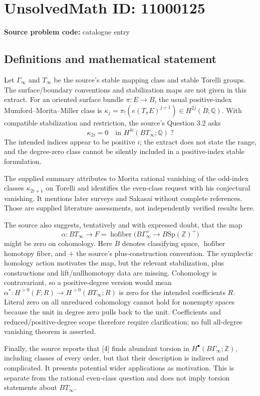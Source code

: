 \documentclass[11pt]{article}
\newcommand{\Z}{\mathbb{Z}}
\newcommand{\Q}{\mathbb{Q}}
\begin{document}
\section*{UnsolvedMath ID: 11000125}
\textbf{Source problem code:} catalogue entry
\subsection{Definitions and mathematical statement}
Let \(\Gamma_\infty\) and \(T_\infty\) be the source's stable mapping class and stable Torelli groups. The surface/boundary conventions and stabilization maps are not given in this extract. For an oriented surface bundle \(\pi:E\to B\), the usual positive-index Mumford--Morita--Miller class is \(\kappa_j=\pi_!(e(T_\pi E)^{j+1})\in H^{2j}(B;\Q)\). With compatible stabilization and restriction, the source's Question 3.2 asks
\[
 \kappa_{2i}=0\quad\text{in }H^{4i}(BT_\infty;\Q)\ ?
\]
The intended indices appear to be positive \(i\); the extract does not state the range, and the degree-zero class cannot be silently included in a positive-index stable formulation.

The supplied summary attributes to Morita rational vanishing of the odd-index classes \(\kappa_{2i+1}\) on Torelli and identifies the even-class request with his conjectural vanishing. It mentions later surveys and Sakasai without complete references. Those are supplied literature assessments, not independently verified results here.

The source also suggests, tentatively and with expressed doubt, that the map
\[
 \alpha:BT_\infty\longrightarrow
 F=\operatorname{hofiber}\bigl(B\Gamma_\infty^+
                 \longrightarrow B\mathrm{Sp}(\Z)^+\bigr)\tag{5}
\]
might be zero on cohomology. Here \(B\) denotes classifying space, \(\operatorname{hofiber}\) homotopy fiber, and \(+\) the source's plus-construction convention. The symplectic homology action motivates the map, but the relevant stabilization, plus constructions and lift/nullhomotopy data are missing. Cohomology is contravariant, so a positive-degree version would mean \(\alpha^*:H^{>0}(F;R)\to H^{>0}(BT_\infty;R)\) is zero for the intended coefficients \(R\). Literal zero on all unreduced cohomology cannot hold for nonempty spaces because the unit in degree zero pulls back to the unit. Coefficients and reduced/positive-degree scope therefore require clarification; no full all-degree vanishing theorem is asserted.

Finally, the source reports that [4] finds abundant torsion in \(H^\bullet(B\Gamma_\infty;\Z)\), including classes of every order, but that their description is indirect and complicated. It presents potential wider applications as motivation. This is separate from the rational even-class question and does not imply torsion statements about \(BT_\infty\).
\end{document}
